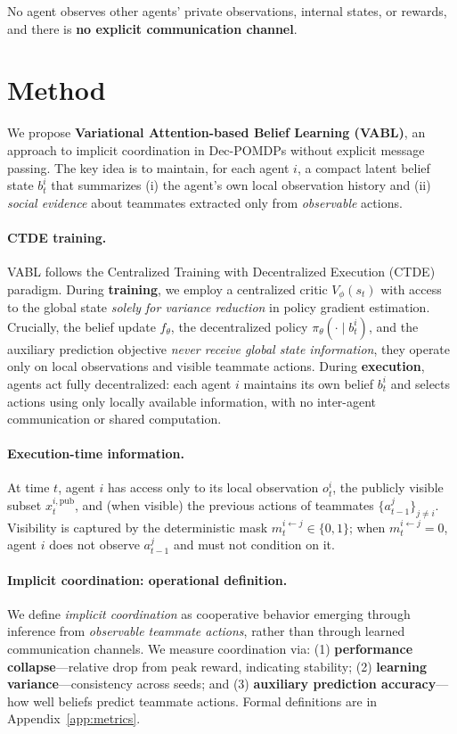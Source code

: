\documentclass{article}
\theoremstyle{plain}
\theoremstyle{definition}
\theoremstyle{remark}
\begin{document}
No agent observes other agents’ private observations, internal states, or rewards, and there is \textbf{no explicit communication channel}.

\section{Method}

We propose \textbf{Variational Attention-based Belief Learning (VABL)}, an approach to implicit coordination in Dec-POMDPs without explicit message passing. The key idea is to maintain, for each agent $i$, a compact latent belief state $b_t^i$ that summarizes (i) the agent's own local observation history and (ii) \emph{social evidence} about teammates extracted only from \emph{observable} actions.

\paragraph{CTDE training.}
VABL follows the Centralized Training with Decentralized Execution (CTDE) paradigm. During \textbf{training}, we employ a centralized critic $V_\phi(s_t)$ with access to the global state \emph{solely for variance reduction} in policy gradient estimation. Crucially, the belief update $f_\theta$, the decentralized policy $\pi_\theta(\cdot \mid b_t^i)$, and the auxiliary prediction objective \emph{never receive global state information}, they operate only on local observations and visible teammate actions. During \textbf{execution}, agents act fully decentralized: each agent $i$ maintains its own belief $b_t^i$ and selects actions using only locally available information, with no inter-agent communication or shared computation.

\paragraph{Execution-time information.}
At time $t$, agent $i$ has access only to its local observation $o_t^i$, the publicly visible subset $x_t^{i,\mathrm{pub}}$, and (when visible) the previous actions of teammates $\{a_{t-1}^j\}_{j\neq i}$. Visibility is captured by the deterministic mask $m_t^{i\leftarrow j}\in\{0,1\}$; when $m_t^{i\leftarrow j}=0$, agent $i$ does not observe $a_{t-1}^j$ and must not condition on it.

\paragraph{Implicit coordination: operational definition.}
We define \emph{implicit coordination} as cooperative behavior emerging through inference from \emph{observable teammate actions}, rather than through learned communication channels. We measure coordination via: (1) \textbf{performance collapse}---relative drop from peak reward, indicating stability; (2) \textbf{learning variance}---consistency across seeds; and (3) \textbf{auxiliary prediction accuracy}---how well beliefs predict teammate actions. Formal definitions are in Appendix~\ref{app:metrics}.
\end{document}
